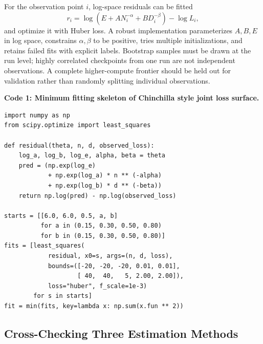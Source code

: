 \documentclass[UTF8,10pt,a4paper,fontset=none]{ctexart}
\begin{document}
For the observation point $i$, log-space residuals can be fitted
\begin{equation}
 r_i=\log\!\left(E+A N_i^{-\alpha}+B D_i^{-\beta}\right)-\log L_i,
 \label{en:eq:residual}
\end{equation}
and optimize it with Huber loss. A robust implementation parameterizes $A,B,E$ in log space, constrains $\alpha,\beta$ to be positive, tries multiple initializations, and retains failed fits with explicit labels. Bootstrap samples must be drawn at the run level; highly correlated checkpoints from one run are not independent observations. A complete higher-compute frontier should be held out for validation rather than randomly splitting individual observations.

\noindent\textbf{ Code 1: Minimum fitting skeleton of Chinchilla style joint loss surface. }\par\vspace{5pt}
\begin{small}
\setlength{\fboxsep}{7pt}
\setlength{\fboxrule}{0.4pt}
\begin{lrbox}{\fitcodebox}
\begin{minipage}{\dimexpr\textwidth-2\fboxsep-2\fboxrule\relax}
\vspace{1pt}
\begin{verbatim}
import numpy as np
from scipy.optimize import least_squares

def residual(theta, n, d, observed_loss):
    log_a, log_b, log_e, alpha, beta = theta
    pred = (np.exp(log_e)
            + np.exp(log_a) * n ** (-alpha)
            + np.exp(log_b) * d ** (-beta))
    return np.log(pred) - np.log(observed_loss)

starts = [[6.0, 6.0, 0.5, a, b]
          for a in (0.15, 0.30, 0.50, 0.80)
          for b in (0.15, 0.30, 0.50, 0.80)]
fits = [least_squares(
            residual, x0=s, args=(n, d, loss),
            bounds=([-20, -20, -20, 0.01, 0.01],
                    [ 40,  40,   5, 2.00, 2.00]),
            loss="huber", f_scale=1e-3)
        for s in starts]
fit = min(fits, key=lambda x: np.sum(x.fun ** 2))
\end{verbatim}
\vspace{-5pt}
\end{minipage}
\end{lrbox}
\noindent{}\par
\end{small}

\subsection{Cross-Checking Three Estimation Methods}
\end{document}

